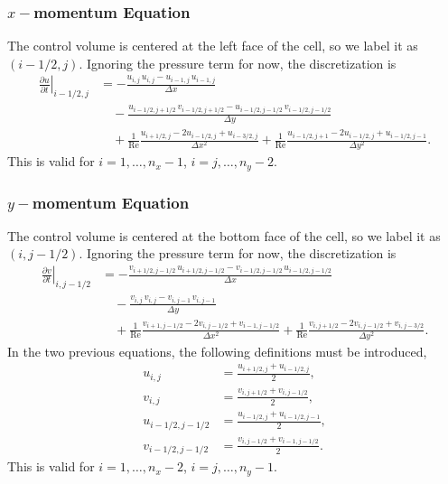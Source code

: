 \documentclass[11pt]{article}
\newcommand{\Rey}{\text{Re}}
\begin{document}
\subsubsection{\texorpdfstring{$x-$}mmomentum Equation}

The control volume is centered at the left face of the cell, so we label it as $(i-1/2, j)$. Ignoring the pressure term for now, the discretization is
\begin{align}\nonumber
\left.\frac{\partial u}{\partial t}\right|_{i-1/2,j} 
&= -  \frac{u_{i,j}\,u_{i,j} - u_{i-1,j}\,u_{i-1,j}}{\Delta x}\\\nonumber
&\quad - \frac{u_{i-1/2,j+1/2}\,v_{i-1/2,j+1/2} - u_{i-1/2,j-1/2}\,v_{i-1/2,j-1/2}}{\Delta y}\\
&\quad + \frac{1}{\Rey}\frac{u_{i+1/2,j} - 2u_{i-1/2,j} + u_{i-3/2,j}}{\Delta x^2} 
+ \frac{1}{\Rey}\frac{u_{i-1/2,j+1} - 2u_{i-1/2,j} + u_{i-1/2,j-1}}{\Delta y^2}.\label{dudt}
\end{align}
This is valid for $i = 1,\hdots,n_x-1$, $i = j,\hdots,n_y-2$.

\subsubsection{\texorpdfstring{$y-$}mmomentum Equation}

The control volume is centered at the bottom face of the cell, so we label it as $(i,j-1/2)$. Ignoring the pressure term for now, the discretization is
\begin{align}\nonumber
\left.\frac{\partial v}{\partial t}\right|_{i,j-1/2} &= - \frac{v_{i+1/2,j-1/2}\,u_{i+1/2,j-1/2} - v_{i-1/2,j-1/2}\,u_{i-1/2,j-1/2}}{\Delta x}\\\nonumber
&\quad - \frac{v_{i,j}\,v_{i,j} - v_{i,j-1}\,v_{i,j-1}}{\Delta y}\\
&\quad + \frac{1}{\Rey}\frac{v_{i+1,j-1/2} - 2v_{i,j-1/2} + v_{i-1,j-1/2}}{\Delta x^2}
+ \frac{1}{\Rey}\frac{ v_{i,j+1/2} - 2v_{i,j-1/2} + v_{i,j-3/2} }{\Delta y^2}.\label{dvdt}
\end{align}
In the two previous equations, the following definitions must be introduced,
\begin{align}
u_{i,j} &= \frac{u_{i+1/2,j} + u_{i-1/2,j}}{2},\\
v_{i,j} &= \frac{v_{i,j+1/2} + v_{i,j-1/2}}{2},\\
u_{i-1/2,j-1/2} &= \frac{u_{i-1/2,j} + u_{i-1/2,j-1}}{2},\\
v_{i-1/2,j-1/2} &= \frac{v_{i,j-1/2} + v_{i-1,j-1/2}}{2}.
\end{align}
This is valid for $i = 1,\hdots,n_x-2$, $i = j,\hdots,n_y-1$.
\end{document}
